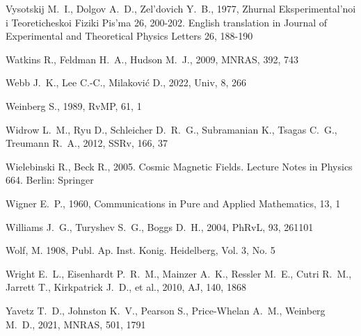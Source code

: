 \documentclass[fleqn,12pt]{article}
\begin{document}
\begin{thebibliography}{}
 Vysotskij M.~I., Dolgov A.~D., Zel'dovich Y.~B., 1977,  Zhurnal Eksperimental'noi i Teoreticheskoi Fiziki Pis'ma 26, 200-202. English translation in Journal of Experimental and Theoretical Physics Letters 26, 188-190 %

 Watkins R., Feldman H.~A., Hudson M.~J., 2009, MNRAS, 392, 743 %

 Webb J.~K., Lee C.-C., Milakovi{\'c} D., 2022, Univ, 8, 266

 Weinberg S., 1989, RvMP, 61, 1

 Widrow L.~M., Ryu D., Schleicher D.~R.~G., Subramanian K., Tsagas C.~G., Treumann R.~A., 2012, SSRv, 166, 37

 Wielebinski R., Beck R., 2005. Cosmic Magnetic Fields.  Lecture Notes in Physics 664. Berlin: Springer

 Wigner E.~P., 1960, Communications in Pure and  Applied Mathematics, 13, 1


 Williams J.~G., Turyshev S.~G., Boggs D.~H., 2004, PhRvL, 93, 261101

Wolf, M. 1908, Publ. Ap. Inst. Konig. Heidelberg, Vol. 3, No. 5

 Wright E.~L., Eisenhardt P.~R.~M., Mainzer A.~K., Ressler M.~E., Cutri R.~M., Jarrett T., Kirkpatrick J.~D., et al., 2010, AJ, 140, 1868

 Yavetz T.~D., Johnston K.~V., Pearson S., Price-Whelan A.~M., Weinberg M.~D., 2021, MNRAS, 501, 1791



\end{thebibliography}
\end{document}

